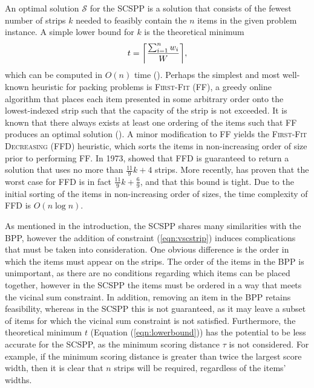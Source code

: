 \documentclass[oribibl]{llncs}
\begin{document}
An optimal solution $\mathcal{S}$ for the SCSPP is a solution that consists of the fewest number of strips $k$ needed to feasibly contain the $n$ items in the given problem instance. A simple lower bound for $k$ is the theoretical minimum
\begin{equation}
\label{eqn:lowerbound}
t = \ceil*{\frac{\sum_{i=1}^{n}w_i}{W}},
\end{equation}
which can be computed in $O(n)$ time (\citealp{martello1990b}). Perhaps the simplest and most well-known heuristic for packing problems is \textsc{First-Fit} (FF), a greedy online algorithm that places each item presented in some arbitrary order onto the lowest-indexed strip such that the capacity of the strip is not exceeded. It is known that there always exists at least one ordering of the items such that FF produces an optimal solution (\citealp{lewis2009}). A minor modification to FF yields the \textsc{First-Fit Decreasing} (FFD) heuristic, which sorts the items in non-increasing order of size prior to performing FF. In 1973, \citeauthor{johnson1973} showed that FFD is guaranteed to return a solution that uses no more than $\frac{11}{9}k + 4$ strips. More recently, \cite{dosa2007} has proven that the worst case for FFD is in fact $\frac{11}{9}k + \frac{6}{9}$, and that this bound is tight. Due to the initial sorting of the items in non-increasing order of sizes, the time complexity of FFD is $O(n\log n)$.

As mentioned in the introduction, the SCSPP shares many similarities with the BPP, however the addition of constraint (\ref{eqn:vscstrip}) induces complications that must be taken into consideration. One obvious difference is the order in which the items must appear on the strips. The order of the items in the BPP is unimportant, as there are no conditions regarding which items can be placed together, however in the SCSPP the items must be ordered in a way that meets the vicinal sum constraint. In addition, removing an item in the BPP retains feasibility, whereas in the SCSPP this is not guaranteed, as it may leave a subset of items for which the vicinal sum constraint is not satisfied. Furthermore, the theoretical minimum $t$ (Equation (\ref{eqn:lowerbound})) has the potential to be less accurate for the SCSPP, as the minimum scoring distance $\tau$ is not considered. For example, if the minimum scoring distance is greater than twice the largest score width, then it is clear that $n$ strips will be required, regardless of the items' widths.
\end{document}
